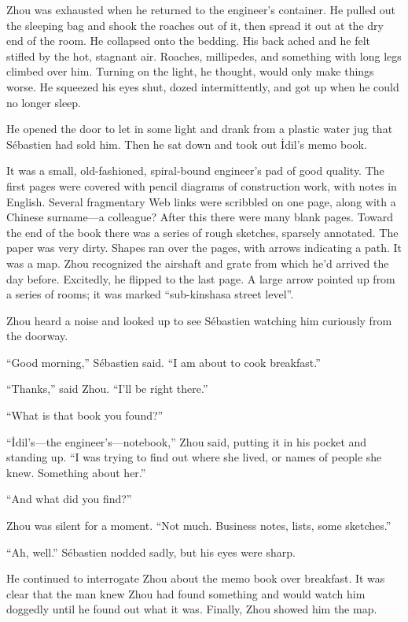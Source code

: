 \documentclass[10pt,b5paper]{article}
\begin{document}
\bigskip

Zhou was exhausted when he returned to the engineer's container.
He pulled out the sleeping bag and shook the roaches out of it,
then spread it out at the dry end of the room. He collapsed onto
the bedding. His back ached and he felt stifled by the hot, stagnant
air. Roaches, millipedes, and something with long legs climbed over
him. Turning on the light, he thought, would only make things worse.
He squeezed his eyes shut, dozed intermittently, and got up when
he could no longer sleep.

He opened the door to let in some light and drank from a plastic
water jug that S\'{e}bastien had sold him. Then he sat down and took
out \.{I}dil's memo book.

It was a small, old-fashioned, spiral-bound engineer's pad of
good quality. The first pages were covered with pencil diagrams of
construction work, with notes in English. Several fragmentary Web
links were scribbled on one page, along with a Chinese surname---a
colleague? After this there were many blank pages. Toward the
end of the book there was a series of rough sketches, sparsely
annotated. The paper was very dirty. Shapes ran over the pages,
with arrows indicating a path. It was a map. Zhou recognized the
airshaft and grate from which he'd arrived the day before. Excitedly,
he flipped to the last page. A large arrow pointed up from a series
of rooms; it was marked ``sub-kinshasa street level''.

Zhou heard a noise and looked up to see S\'{e}bastien watching him
curiously from the doorway.

``Good morning,'' S\'{e}bastien said. ``I am about to cook breakfast.''

``Thanks,'' said Zhou. ``I'll be right there.''

``What is that book you found?''

``\.{I}dil's---the engineer's---notebook,'' Zhou said, putting it in his
pocket and standing up. ``I was trying to find out where she lived,
or names of people she knew. Something about her.''

``And what did you find?''

Zhou was silent for a moment. ``Not much. Business notes, lists,
some sketches.''

``Ah, well.'' S\'{e}bastien nodded sadly, but his eyes were sharp.

He continued to interrogate Zhou about the memo book over
breakfast. It was clear that the man knew Zhou had found something
and would watch him doggedly until he found out what it was. Finally,
Zhou showed him the map.
\end{document}

